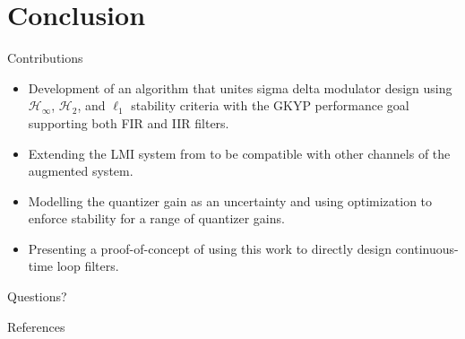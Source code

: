 \documentclass[10pt,usenames,dvipsnames]{beamer}
\newcommand{\themename}{\textbf{\textsc{metropolis}}\xspace}
\begin{document}
\section{Conclusion}

\begin{frame}{Contributions}

\begin{itemize}
	\item Development of an algorithm that unites sigma delta modulator design using $\mathcal{H}_\infty$, $\mathcal{H}_2$, and $\ell_1$ stability criteria with the GKYP performance goal supporting both FIR and IIR filters.
	\item Extending the LMI system from \cite{Li2014} to be compatible with other channels of the augmented system.
	\item Modelling the quantizer gain as an uncertainty and using optimization to enforce stability for a range of quantizer gains.
	\item Presenting a proof-of-concept of using this work to directly design continuous-time loop filters.
\end{itemize}

\end{frame}

{
\begin{frame}[standout]
  Questions?
\end{frame}
}

%
%

\begin{frame}[allowframebreaks]{References}

	
	

\end{frame}
\end{document}
